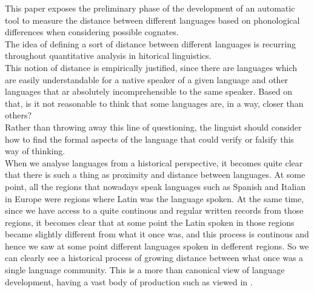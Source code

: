 \documentclass[runningheads]{llncs}
\begin{document}
This paper exposes the preliminary phase of the development of an automatic tool to measure the distance between different languages based on phonological differences when considering possible cognates.\\




The idea of defining a sort of distance between different languages is recurring throughout quantitative analysis in hitorical linguistics\cite{crowley2010introduction}. \\

This notion of distance is empirically justified, since there are languages which are easily understandable for a native speaker of a given language and other languages that ar absolutely incomprehensible to the same speaker. Based on that, is it not reasonable to think that some languages are, in a way, closer than others?\\

Rather than throwing away this line of questioning, the linguist should consider how to find the formal aspects of the language that could verify or falsify this way of thinking.\\

When we analyse languages from a historical perspective, it becomes quite clear that there is such a thing as proximity and distance between languages. At some point, all the regions that nowadays speak languages such as Spanish and Italian in Europe were regions where Latin was the language spoken. At the same time, since we have access to a quite continous and regular written records from those regions, it becomes clear that at some point the Latin spoken in those regions became slightly different from what it once was, and this process is continous and hence we saw at some point different languages spoken in defferent regions. So we can clearly see a historical process of growing distance between what once was a single language community. This is a more than canonical view of language development, having a vast body of production such as viewed in \cite{mcmahon2005language}.\\
\end{document}
